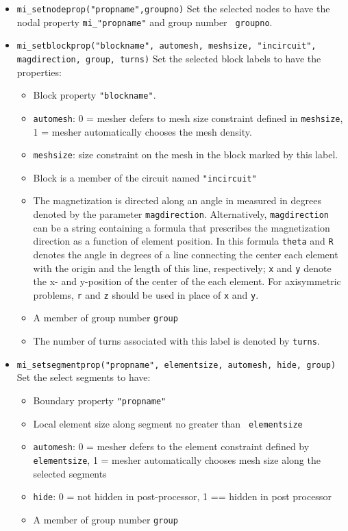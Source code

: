 \begin{itemize}
\item{\tt mi\_setnodeprop("propname",groupno)} Set the selected nodes to
have the nodal property {\tt mi\_"propname"} and group number {\tt
groupno}.

\item{\tt mi\_setblockprop("blockname", automesh, meshsize, "incircuit",
magdirection, group, turns)} Set the selected block labels to have the
properties:
\begin{itemize}
\item Block property {\tt "blockname"}.
\item {\tt automesh}: 0 = mesher defers to mesh size constraint defined in {\tt meshsize},
         1 = mesher automatically chooses the mesh density.
\item {\tt meshsize}: size constraint on the mesh in the block marked by this label.
\item Block is a member of the circuit named {\tt "incircuit"}
\item The magnetization is directed along an angle in measured in degrees denoted by the parameter
        {\tt magdirection}.  Alternatively, {\tt magdirection} can be a string containing a
		formula that prescribes the magnetization direction as a function of element position.
		In this formula {\tt theta} and {\tt R} denotes the angle in degrees of a line connecting the
		center each element with the origin and the length of this line, respectively;
		{\tt x} and {\tt y} denote the x- and y-position of the
		center of the each element.  For axisymmetric problems, {\tt r} and {\tt z} should
		be used in place of {\tt x} and {\tt y}.
\item A member of group number {\tt group}
\item The number of turns associated with this label is denoted by {\tt turns}.
\end{itemize}

\item{\tt mi\_setsegmentprop("propname", elementsize, automesh, hide,
group)} Set the select segments to have:
\begin{itemize}
\item Boundary property {\tt "propname"}
\item Local element size along segment no greater than {\tt
elementsize}
\item {\tt automesh}:  0 = mesher defers to the element constraint defined by {\tt elementsize},
        1 = mesher automatically chooses mesh size along the selected segments
\item {\tt hide}: 0 =  not hidden in post-processor, 1 == hidden in post processor
\item A member of group number {\tt group}
\end{itemize}


\end{itemize}

